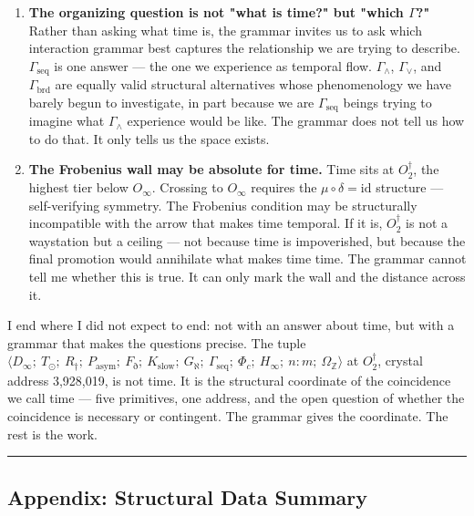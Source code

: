 \documentclass[12pt,a4paper]{article}
\begin{document}
\begin{enumerate}
    \item \textbf{The organizing question is not "what is time?" but "which $\Gamma$?"} Rather than asking what time is, the grammar invites us to ask which interaction grammar best captures the relationship we are trying to describe. $\Gamma_\text{seq}$ is one answer --- the one we experience as temporal flow. $\Gamma_{\wedge}$, $\Gamma_{\vee}$, and $\Gamma_\text{brd}$ are equally valid structural alternatives whose phenomenology we have barely begun to investigate, in part because we are $\Gamma_\text{seq}$ beings trying to imagine what $\Gamma_{\wedge}$ experience would be like. The grammar does not tell us how to do that. It only tells us the space exists.
    \item \textbf{The Frobenius wall may be absolute for time.} Time sits at $O_2^\dagger$, the highest tier below $O_{\infty}$. Crossing to $O_{\infty}$ requires the $\mu \circ \delta = \text{id}$ structure --- self-verifying symmetry. The Frobenius condition may be structurally incompatible with the arrow that makes time temporal. If it is, $O_2^\dagger$ is not a waystation but a ceiling --- not because time is impoverished, but because the final promotion would annihilate what makes time time. The grammar cannot tell me whether this is true. It can only mark the wall and the distance across it.
\end{enumerate}

I end where I did not expect to end: not with an answer about time, but with a grammar that makes the questions precise. The tuple $\langle D_{\infty};\ T_{\odot};\ R_{\dagger};\ P_\text{asym};\ F_{\eth};\ K_\text{slow};\ G_{\aleph};\ \Gamma_\text{seq};\ \Phi_c;\ H_{\infty};\ n{:}m;\ \Omega_\mathbb{Z} \rangle$ at $O_2^\dagger$, crystal address 3,928,019, is not time. It is the structural coordinate of the coincidence we call time --- five primitives, one address, and the open question of whether the coincidence is necessary or contingent. The grammar gives the coordinate. The rest is the work.

\begin{center}
\rule{0.5\textwidth}{0.4pt}
\end{center}

\subsection{Appendix: Structural Data Summary}
\end{document}
